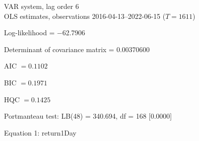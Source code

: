 \begin{center}
VAR system, lag order 6\\
OLS estimates, observations 2016-04-13--2022-06-15 ($T=1611$)
\end{center}
\noindent
Log-likelihood = $-$62.7906\par
\noindent
Determinant of covariance matrix = 0.00370600\par
\noindent
AIC $= 0.1102$ \par
\noindent
BIC $= 0.1971$ \par
\noindent
HQC $= 0.1425$ \par
\noindent
Portmanteau test: LB(48) = 340.694, df = 168 [0.0000]\par
\begin{center}

Equation 1: return1Day\\


\end{center}
